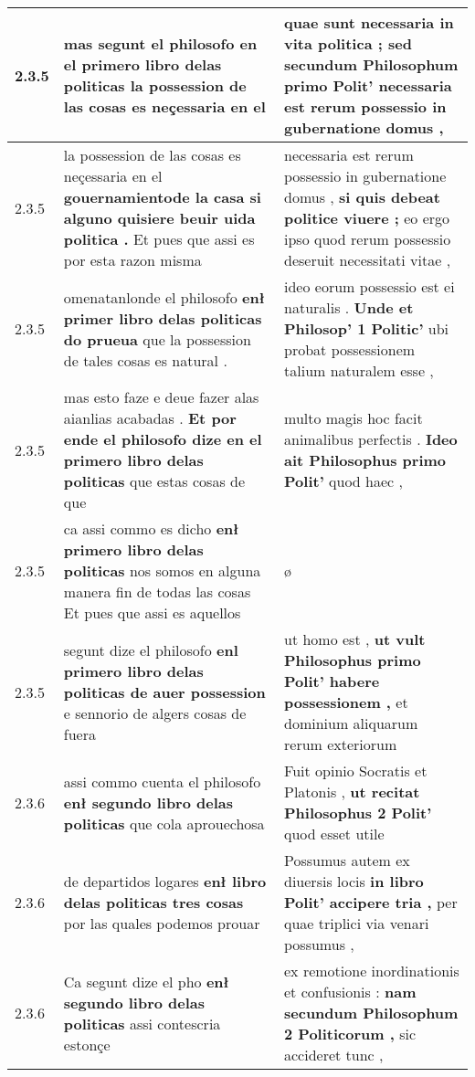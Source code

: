 \begin{tabular}{|p{1cm}|p{6.5cm}|p{6.5cm}|}
2.3.5 & mas segunt el philosofo \textbf{ en el primero libro delas politicas } la possession de las cosas es neçessaria en el & quae sunt necessaria in vita politica ; \textbf{ sed secundum Philosophum primo Polit’ } necessaria est rerum possessio in gubernatione domus , \\\hline
2.3.5 & la possession de las cosas es neçessaria en el \textbf{ gouernamientode la casa si alguno quisiere beuir uida politica . } Et pues que assi es por esta razon misma & necessaria est rerum possessio in gubernatione domus , \textbf{ si quis debeat politice viuere ; } eo ergo ipso quod rerum possessio deseruit necessitati vitae , \\\hline
2.3.5 & omenatanlonde el philosofo \textbf{ enł primer libro delas politicas do prueua } que la possession de tales cosas es natural . & ideo eorum possessio est ei naturalis . \textbf{ Unde et Philosop’ 1 Politic’ } ubi probat possessionem talium naturalem esse , \\\hline
2.3.5 & mas esto faze e deue fazer alas aianlias acabadas . \textbf{ Et por ende el philosofo dize en el primero libro delas politicas } que estas cosas de que & multo magis hoc facit animalibus perfectis . \textbf{ Ideo ait Philosophus primo Polit’ } quod haec , \\\hline
2.3.5 & ca assi commo es dicho \textbf{ enł primero libro delas politicas } nos somos en alguna manera fin de todas las cosas Et pues que assi es aquellos & ø \\\hline
2.3.5 & segunt dize el philosofo \textbf{ enl primero libro delas politicas de auer possession } e sennorio de algers cosas de fuera & ut homo est , \textbf{ ut vult Philosophus primo Polit’ habere possessionem , } et dominium aliquarum rerum exteriorum \\\hline
2.3.6 & assi commo cuenta el philosofo \textbf{ enł segundo libro delas politicas } que cola aprouechosa & Fuit opinio Socratis et Platonis , \textbf{ ut recitat Philosophus 2 Polit’ } quod esset utile \\\hline
2.3.6 & de departidos logares \textbf{ enł libro delas politicas tres cosas } por las quales podemos prouar & Possumus autem ex diuersis locis \textbf{ in libro Polit’ accipere tria , } per quae triplici via venari possumus , \\\hline
2.3.6 & Ca segunt dize el pho \textbf{ enł segundo libro delas politicas } assi contescria estonçe & ex remotione inordinationis et confusionis : \textbf{ nam secundum Philosophum 2 Politicorum , } sic accideret tunc , \\\hline

\end{tabular}
